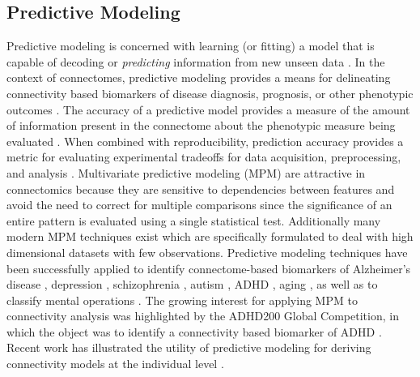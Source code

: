 \documentclass[5p]{elsarticle}
\begin{document}
\subsection{Predictive Modeling}




Predictive modeling is concerned with learning (or fitting) a model that is
capable of decoding or \emph{predicting} information from new unseen data
\cite{pereira2009}.  In the context of connectomes, predictive modeling provides
a means for delineating connectivity based biomarkers of disease diagnosis,
prognosis, or other phenotypic outcomes \cite{craddock2009, dosenbach2010}. The
accuracy of a predictive model provides a measure of the amount of information
present in the connectome about the phenotypic measure being evaluated
\cite{kjems2002, kriegeskorte2006}.  When combined with reproducibility, prediction accuracy
provides a metric for evaluating experimental tradeoffs for data acquisition,
preprocessing, and analysis \cite{strother2002, laconte2003}.  Multivariate
predictive modeling (MPM)
are attractive in connectomics because they are sensitive to dependencies
between features and avoid the need to correct for multiple comparisons since
the significance of an entire pattern is evaluated using a single statistical
test. 
Additionally many modern MPM techniques exist which are specifically
formulated to deal with high dimensional datasets with few observations.
Predictive modeling techniques have been
successfully applied to identify connectome-based biomarkers of Alzheimer's
disease \cite{stonnington2010}, depression \cite{craddock2009, zeng2012}, schizophrenia
\cite{cecchi2009}, autism \cite{anderson2011}, ADHD \cite{zhu2008,}, aging
\cite{dosenbach2010}, as well as to classify mental operations
\cite{richiardi2011,shirer2012}. The growing interest for applying MPM 
to connectivity analysis was highlighted by the ADHD200
Global Competition, in which the object was to identify a connectivity based
biomarker of ADHD \cite{adhd2002012}. Recent work has illustrated the utility
of predictive modeling for deriving connectivity models at the individual level
\cite{chu2011}.



\end{document}
